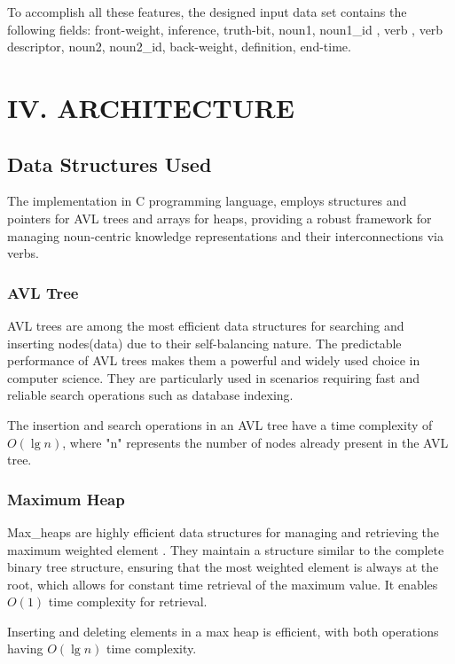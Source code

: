 \documentclass[conference]{IEEEtran}
\begin{document}
To accomplish all these features, the designed input data set contains the following fields: front-weight, inference, truth-bit, noun1, noun1\_id , verb , verb descriptor, noun2, noun2\_id, back-weight, definition, end-time.




\section*{IV. ARCHITECTURE}

\subsection{Data Structures Used}
The implementation in C programming language\cite{b9}, employs structures and pointers for AVL trees and arrays for heaps, providing a robust framework for managing noun-centric knowledge representations and their interconnections via verbs.

\subsubsection{AVL Tree}

AVL trees\cite{b14} are among the most efficient data structures for searching and inserting nodes(data) due to their 
self-balancing nature. The predictable performance of AVL trees makes 
them a powerful and widely used choice in computer 
science.
They are particularly used in scenarios requiring fast and reliable search operations such as database indexing.

The insertion and search operations in an AVL tree have a time complexity of $O(\lg n)$, 
where "n" represents the number of nodes already present in the AVL tree.


\subsubsection{Maximum Heap}

Max\_heaps\cite{b14} are highly efficient data structures for managing and retrieving the maximum weighted element . 
They maintain a structure similar to the complete binary tree structure, ensuring that the most weighted 
element is always at the root, which allows for constant time retrieval of the maximum value.
It enables $O(1)$ time complexity for retrieval.

Inserting and deleting elements in a max heap is efficient, with both operations having $O(\lg n)$ 
   time complexity.
\end{document}
